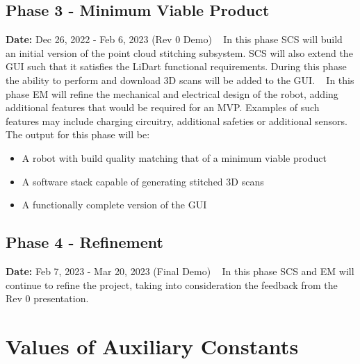 \documentclass[12pt]{article}
\begin{document}
\subsection{Phase 3 - Minimum Viable Product}
\textbf{Date:} Dec 26, 2022 - Feb 6, 2023 (Rev 0 Demo)
\ \newline\newline
In this phase SCS will build an initial version of the point cloud stitching subsystem. SCS
will also extend the GUI such that it satisfies the LiDart functional requirements. During this
phase the ability to perform and download 3D scans will be added to the GUI.
\ \newline\newline
In this phase EM will refine the mechanical and electrical design of the robot, adding additional
features that would be required for an MVP. Examples of such features may include charging circuitry,
additional safeties or additional sensors.
\ \newline\newline
The output for this phase will be:
\begin{itemize}
\item A robot with build quality matching that of a minimum viable product
\item A software stack capable of generating stitched 3D scans
\item A functionally complete version of the GUI
\end{itemize}

\subsection{Phase 4 - Refinement}
\textbf{Date:} Feb 7, 2023 - Mar 20, 2023 (Final Demo)
\ \newline\newline
In this phase SCS and EM will continue to refine the project, taking into consideration the feedback from the Rev 0 presentation.

\section{Values of Auxiliary Constants}
\label{sec_ac}


\end{document}
